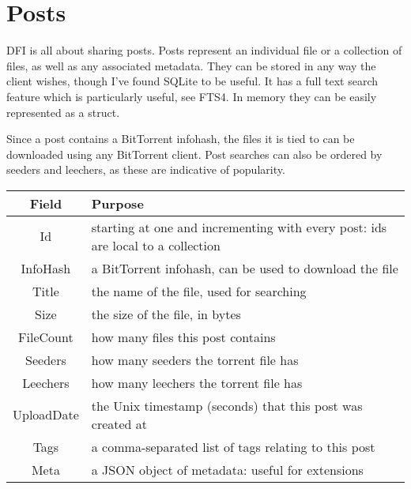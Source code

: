 \section{Posts}
DFI is all about sharing posts. Posts represent an individual file or a
collection of files, as well as any associated metadata. They can be stored in
any way the client wishes, though I've found SQLite to be useful. It has a
full text search feature which is particularly useful, see FTS4. In memory they
can be easily represented as a struct.

Since a post contains a BitTorrent infohash, the files it is tied to can be
downloaded using any BitTorrent client. Post searches can also be ordered by
seeders and leechers, as these are indicative of popularity.\\

\begin{minipage}{\linewidth}
\begin{center}
	\begin{tabular}{ c|p{8cm} }
	\textbf{Field} & \textbf{Purpose} \\  
	\hline
	Id             & starting at one and incrementing with
	                 every post: ids are local to a collection \\
	\hline
	InfoHash       & a BitTorrent infohash, can be used to download the file \\
	\hline
	Title          & the name of the file, used for searching \\
	\hline
	Size           & the size of the file, in bytes \\
	\hline
	FileCount      & how many files this post contains \\
	\hline
	Seeders        & how many seeders the torrent file has \\
	\hline
	Leechers       & how many leechers the torrent file has \\
	\hline
	UploadDate     & the Unix timestamp (seconds) that this post was created at
	\\
	\hline
	Tags           & a comma-separated list of tags relating to this post \\
	\hline
	Meta           & a JSON object of metadata: useful for extensions\\
	\hline
\end{tabular}
\end{center}
\end{minipage}

